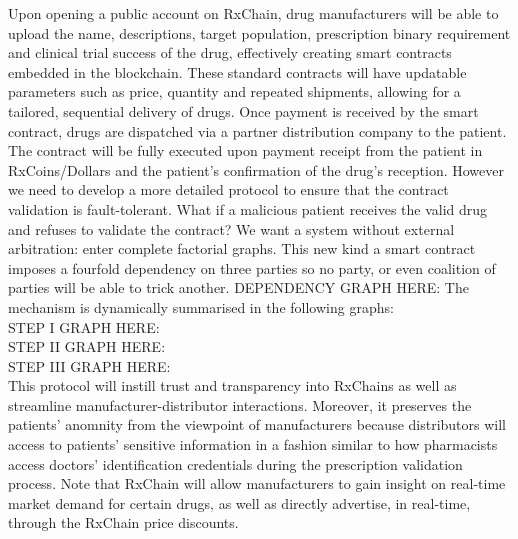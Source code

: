 Upon opening a public account on RxChain, drug manufacturers will be
able to upload the name, descriptions, target population, prescription binary
requirement and clinical trial success of the drug,
effectively creating smart contracts embedded in the blockchain. These
standard contracts will have updatable parameters such as price,
quantity and repeated shipments, allowing for a tailored, sequential
delivery of drugs.
Once payment is received by the smart contract, drugs are dispatched
via a partner distribution company to the patient.
The contract will be fully executed upon payment receipt from the patient in RxCoins/Dollars
and the patient's confirmation of the drug's reception.
However we need to develop a more detailed protocol to ensure that the contract
validation is fault-tolerant. What if a malicious patient
receives the valid drug and refuses to validate the contract? We want
a system without external arbitration: enter complete factorial
graphs.
This new kind a smart contract imposes a fourfold dependency on three
parties so no party, or even coalition of parties will be able to
trick another.
DEPENDENCY GRAPH HERE:
The mechanism is dynamically summarised in the following graphs:\\
STEP I GRAPH HERE:\\
STEP II GRAPH HERE:\\
STEP III GRAPH HERE:\\

This protocol will instill trust and transparency into RxChains as well as streamline
manufacturer-distributor interactions.
Moreover, it  preserves the patients' anomnity from the viewpoint of manufacturers because
distributors will access to patients' sensitive information in a fashion similar
to how pharmacists access doctors' identification credentials during the prescription validation process.
Note that RxChain  will allow manufacturers to gain insight on real-time market demand for certain drugs,
as well as directly advertise, in real-time, through the RxChain price discounts. 


